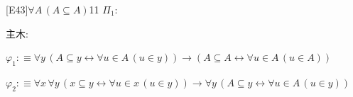\begin{fullproof}{[E43]}{$\forall A\,(A \subseteq A)$}{11}\label{tree:SubRefl}
\noindent$\Pi_{1}$:
\begin{ptree}
\end{ptree}
\noindent 主木:
\begin{ptree}
\noLine
{}
\end{ptree}
\begin{abbrevlist}
\item $\varphi_{1} :\equiv \forall y\,(A \subseteq y \leftrightarrow \forall u \in A\,(u \in y)) \to (A \subseteq A \leftrightarrow \forall u \in A\,(u \in A))$
\item $\varphi_{2} :\equiv \forall x\,\forall y\,(x \subseteq y \leftrightarrow \forall u \in x\,(u \in y)) \to \forall y\,(A \subseteq y \leftrightarrow \forall u \in A\,(u \in y))$
\end{abbrevlist}
\end{fullproof}

